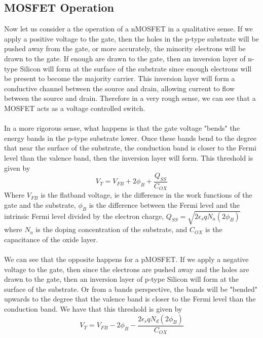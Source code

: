 \documentclass[
  reprint,
  amsmath,amssymb,
  aps
]{revtex4-1}
\begin{document}
\subsection*{MOSFET Operation}
Now let us consider a the operation of a nMOSFET in a qualitative sense. If we apply a positive voltage to the gate, then 
the holes in the p-type substrate will be pushed away from the gate, or more accurately, the minority electrons will be drawn 
to the gate. If enough are drawn to the gate, then an inversion layer of n-type Silicon will form at the surface of the substrate since 
enough electrons will be present to become the majority carrier. This inversion layer will form a conductive channel between the source and drain, 
allowing current to flow between the source and drain. Therefore in a very rough sense, we can see that a MOSFET acts 
as a voltage controlled switch.\\\\
In a more rigorous sense, what happens is that the gate voltage "bends" the energy bands in the p-type substrate lower. 
Once these bands bend to the degree that near the surface of the substrate, the conduction band is closer to the 
Fermi level than the valence band, then the inversion layer will form. This threshold is given by 
\begin{equation}
    V_{T} = V_{FB} + 2\phi_{B} + \frac{Q_{SS}}{C_{OX}}
    \label{eq:threshold_nMOSFET}
\end{equation}
Where $V_{FB}$ is the flatband voltage, ie the difference in the work functions of the gate and the substrate, $\phi_{B}$ is the 
difference between the Fermi level and the intrinsic Fermi level divided by the electron charge, $Q_{SS}=\sqrt{2\epsilon_{s}qN_{a}(2\phi_{B})}$ where 
$N_a$ is the doping concentration of the substrate, and $C_{OX}$ is the capacitance of the oxide layer.\\\\
We can see that the opposite happens for a pMOSFET. If we apply a negative voltage to the gate, then since the electrons are pushed 
away and the holes are drawn to the gate, then an inversion layer of p-type Silicon will form at the surface of the substrate. Or 
from a bands perspective, the bands will be "bended" upwards to the degree that the valence band is closer to the Fermi level than the
conduction band. We have that this threshold is given by
\begin{equation}
    V_{T} = V_{FB} - 2\phi_{B} - \frac{2\epsilon_{s}qN_{d}(2\phi_{B})}{C_{OX}}
    \label{eq:threshold_pMOSFET}
\end{equation}
\end{document}
